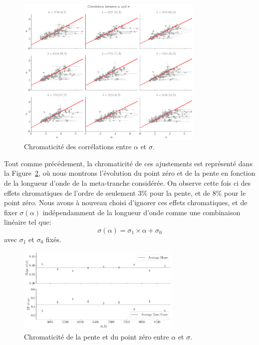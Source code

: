 \documentclass[../main/main.tex]{subfiles}
\begin{document}
\begin{figure}[ht]
  \centering
  \includegraphics[width=0.8\textwidth]{../figures/06_irf/STD_alpha_sigma_chromatic_corr.pdf}
  \caption[Chromaticité des corrélations entre $\alpha$ et $\sigma$]{Chromaticité des corrélations entre $\alpha$ et $\sigma$.}
  \label{fig:alphasigmachromcorr}
\end{figure}

Tout comme précédement, la chromaticité de ces ajustements est représenté dans la
Figure~\ref{fig:chromslope_zp_alphasigma}, où nous montrons l'évolution
du point zéro et de la pente en fonction de la
longueur d'onde de la meta-tranche considérée. On observe cette fois ci des effets
chromatiques de l'ordre de seulement $3\%$ pour la pente, et de $8\%$ pour le
point zéro.
Nous avons à nouveau choisi d'ignorer ces effets chromatiques, et de fixer
$\sigma(\alpha)$ indépendamment de la longueur d'onde comme une
combinaison linéaire tel que:
\begin{equation}
  \label{eq:betaalpha}
  \sigma(\alpha) = \sigma_{1}\times \alpha + \sigma_{0}
\end{equation}
avec $\sigma_{1}$ et $\sigma_{0}$ fixés.

\begin{figure}[ht]
  \centering
  \includegraphics[width=0.7\textwidth]{../figures/06_irf/chromaticitysigma_alpha_corr.pdf}
  \caption[Chromaticité de la pente et du point zéro entre $\alpha$ et $\sigma$]{Chromaticité de la pente et du point zéro entre $\alpha$ et $\sigma$.}
  \label{fig:chromslope_zp_alphasigma}
\end{figure}
\end{document}
